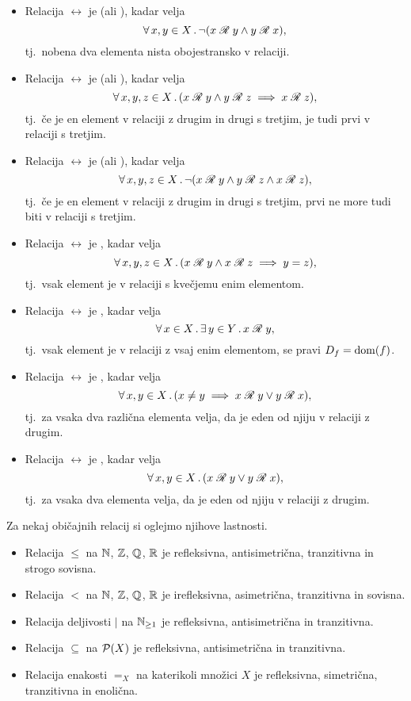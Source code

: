 \begin{definicija}
\begin{itemize}
				\item
					Relacija $\rel$ je  (ali ), kadar velja
					\[\xall{x, y}[X]{\lnot(\rel[x][y] \land \rel[y][x])},\]
					tj.~nobena dva elementa nista obojestransko v relaciji.
				\item
					Relacija $\rel$ je  (ali ), kadar velja
					\[\all{x, y, z}[X]{\rel[x][y] \land \rel[y][z] \implies \rel[x][z]},\]
					tj.~če je en element v relaciji z drugim in drugi s tretjim, je tudi prvi v relaciji s tretjim.
				\item
					Relacija $\rel$ je  (ali ), kadar velja
					\[\xall{x, y, z}[X]{\lnot(\rel[x][y] \land \rel[y][z] \land \rel[x][z])},\]
					tj.~če je en element v relaciji z drugim in drugi s tretjim, prvi ne more tudi biti v relaciji s tretjim.
				\item
					Relacija $\rel$ je , kadar velja
					\[\all{x, y, z}[X]{\rel[x][y] \land \rel[x][z] \implies y = z},\]
					tj.~vsak element je v relaciji s kvečjemu enim elementom.
				\item
					Relacija $\rel$ je , kadar velja
					\[\xall{x}[X]{\xsome{y}[Y]{\rel[x][y]}},\]
					tj.~vsak element je v relaciji z vsaj enim elementom, se pravi $D_{f} = \mathrm{dom}(f)$.
				\item
					Relacija $\rel$ je , kadar velja
					\[\all{x, y}[X]{x \neq y \implies \rel[x][y] \lor \rel[y][x]},\]
					tj.~za vsaka dva različna elementa velja, da je eden od njiju v relaciji z drugim.
				\item
					Relacija $\rel$ je , kadar velja
					\[\all{x, y}[X]{\rel[x][y] \lor \rel[y][x]},\]
					tj.~za vsaka dva elementa velja, da je eden od njiju v relaciji z drugim.
			\end{itemize}
		\end{definicija}
		
		\begin{zgled}
			Za nekaj običajnih relacij si oglejmo njihove lastnosti.
			\begin{itemize}
				\item
					Relacija $\leq$ na $\mathbb{N}$, $\mathbb{Z}$, $\mathbb{Q}$, $\mathbb{R}$ je refleksivna, antisimetrična, tranzitivna in strogo sovisna.
				\item
					Relacija $<$ na $\mathbb{N}$, $\mathbb{Z}$, $\mathbb{Q}$, $\mathbb{R}$ je irefleksivna, asimetrična, tranzitivna in sovisna.
				\item
					Relacija deljivosti $|$ na $\mathbb{N}_{\geq 1}$ je refleksivna, antisimetrična in tranzitivna.
				\item
					Relacija $\subseteq$ na $\mathcal{P}(X)$ je refleksivna, antisimetrična in tranzitivna.
				\item
					Relacija enakosti $=_X$ na katerikoli množici $X$ je refleksivna, simetrična, tranzitivna in enolična.
			\end{itemize}
		\end{zgled}
		
